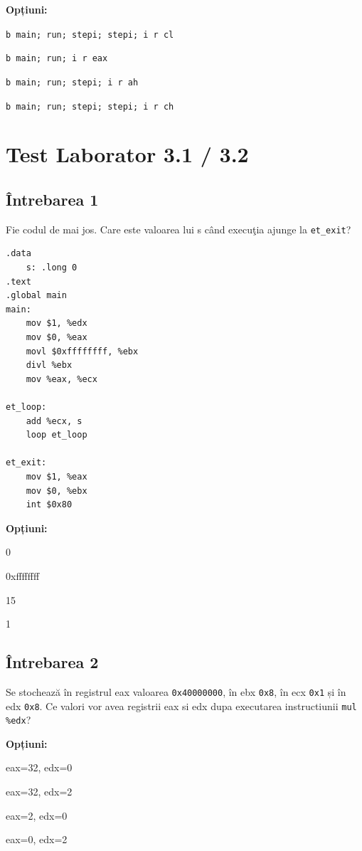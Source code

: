 \documentclass[12pt,a4paper]{article}
\begin{document}
\textbf{Opțiuni:}
\begin{itemize*}
    \item \texttt{b main; run; stepi; stepi; i r cl}
    \item \texttt{b main; run; i r eax}
    \item \texttt{b main; run; stepi; i r ah}
    \item \texttt{b main; run; stepi; stepi; i r ch} 
\end{itemize*}

\newpage
\section{Test Laborator 3.1 / 3.2}

\subsection*{Întrebarea 1}
Fie codul de mai jos. Care este valoarea lui s c\^and execu\c{t}ia ajunge la \texttt{et\_exit}?
\begin{lstlisting}[language=x86asm, caption={Cod Sursa (Lab 3.1)}]
.data
    s: .long 0
.text
.global main
main:
    mov $1, %edx
    mov $0, %eax
    movl $0xffffffff, %ebx
    divl %ebx
    mov %eax, %ecx

et_loop:
    add %ecx, s
    loop et_loop

et_exit:
    mov $1, %eax
    mov $0, %ebx
    int $0x80
\end{lstlisting}

\textbf{Opțiuni:}
\begin{itemize*}
    \item 0
    \item 0xffffffff
    \item 15
    \item 1
\end{itemize*}

\subsection*{Întrebarea 2}
Se stochează în registrul eax valoarea \texttt{0x40000000}, în ebx \texttt{0x8}, în ecx \texttt{0x1} și în edx \texttt{0x8}. Ce valori vor avea registrii eax si edx dupa executarea instructiunii \texttt{mul \%edx}?

\textbf{Opțiuni:}
\begin{itemize*}
    \item eax=32, edx=0
    \item eax=32, edx=2
    \item eax=2, edx=0
    \item eax=0, edx=2
\end{itemize*}
\end{document}
